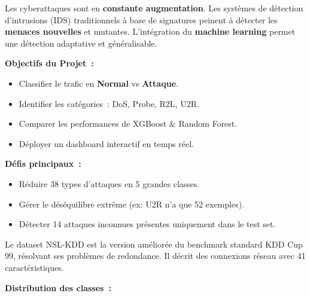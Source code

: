 \documentclass{article}
\newlength{\colW}  \setlength{\colW}{180mm}
\newcommand{\bodyfont}{\fontsize{15.3}{20.5}\selectfont}
\newcommand{\labelfont}{\fontsize{13.5}{17}\selectfont\bfseries}
\newcommand{\citem}[1]{\item[\textcolor{CyanAccent}{\faAngleRight}] #1}
\begin{document}
\noindent
\begin{minipage}[t]{\colW}

\begin{tcolorbox}[pc, title={\faIcon{shield-alt}\; Contexte \& Objectifs}]
\bodyfont\color{TextMain}
Les cyberattaques sont en \textbf{\color{CyanAccent}constante augmentation}. Les syst\`emes de d\'etection d'intrusions (IDS) traditionnels \`a base de signatures peinent \`a d\'etecter les \textbf{\color{Magenta}menaces nouvelles} et mutantes. L'int\'egration du \textbf{machine learning} permet une d\'etection adaptative et g\'en\'eralisable.

\vspace{5mm}
{\labelfont\color{CyanAccent}Objectifs du Projet~:}
\begin{itemize}[leftmargin=6mm, itemsep=2mm, topsep=2mm]
  \citem{Classifier le trafic en \textbf{Normal} vs \textbf{Attaque}.}
  \citem{Identifier les cat\'egories~: DoS, Probe, R2L, U2R.}
  \citem{Comparer les performances de XGBoost \& Random Forest.}
  \citem{D\'eployer un dashboard interactif en temps r\'eel.}
\end{itemize}

\vspace{5mm}
{\labelfont\color{CyanAccent}D\'efis principaux~:}
\begin{itemize}[leftmargin=6mm, itemsep=2mm, topsep=2mm]
  \citem{R\'eduire 38 types d'attaques en 5 grandes classes.}
  \citem{G\'erer le d\'es\'equilibre extr\^eme (ex: U2R n'a que 52 exemples).}
  \citem{D\'etecter 14 attaques inconnues pr\'esentes uniquement dans le test set.}
\end{itemize}
\end{tcolorbox}

\vspace{5mm}

\begin{tcolorbox}[pc, title={\faDatabase\; Dataset NSL-KDD}]
\bodyfont\color{TextMain}
Le dataset NSL-KDD est la version am\'elior\'ee du benchmark standard KDD Cup 99, r\'esolvant ses probl\`emes de redondance. Il d\'ecrit des connexions r\'eseau avec 41 caract\'eristiques.

\vspace{6mm}
{\labelfont\color{CyanAccent}Distribution des classes~:}
\vspace{2mm}


\end{tcolorbox}
\end{minipage}
\end{document}
